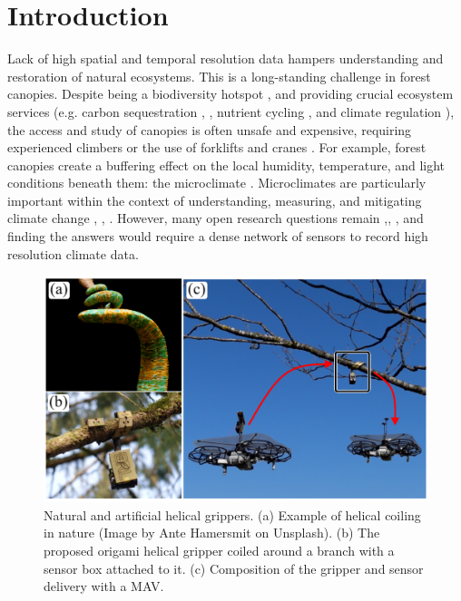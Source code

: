 \section{Introduction}

Lack of high spatial and temporal resolution data hampers understanding and restoration of natural ecosystems. This is a long-standing challenge in forest canopies. Despite being a biodiversity hotspot \cite{Nakamura2017}, \cite{Ozanne2003d} and providing crucial ecosystem services (e.g. carbon sequestration \cite{Harris2012}, \cite{Didham2004}, nutrient cycling \cite{CE2002}, and climate regulation \cite{Ellison2012}), the access and study of canopies is often unsafe and expensive, requiring experienced climbers or the use of forklifts and cranes \cite{Parker1992}. For example, forest canopies create a buffering effect on the local humidity, temperature, and light conditions beneath them: the microclimate \cite{Nakamura2017}. Microclimates are particularly important within the context of understanding, measuring, and mitigating climate change \cite{Frenne2021}, \cite{Zellweger2020}, \cite{VonArx2012}. However, many open research questions remain \cite{Jucker2020},\cite{Bachofen2020}, \cite{Law2020}, and finding the answers would require a dense network of sensors to record high resolution climate data.
\begin{figure} [htbp]
    \centering
    \includegraphics{figs/fig_1_all-in-one/Figure_1.pdf}
    \caption{Natural and artificial helical grippers. (a) Example of helical coiling in nature (Image by Ante Hamersmit on Unsplash). (b) The proposed origami helical gripper coiled around a branch with a sensor box attached to it. (c) Composition of the gripper and sensor delivery with a MAV.}
    \label{fig:bio-inspiration}
\end{figure}

